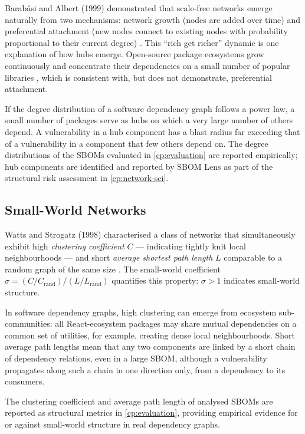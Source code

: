 Barabási and Albert (1999) demonstrated that scale-free networks emerge naturally from two mechanisms: network growth (nodes are added over time) and preferential attachment (new nodes connect to existing nodes with probability proportional to their current degree) \citep{Barabasi1999}. This ``rich get richer'' dynamic is one explanation of how hubs emerge. Open-source package ecosystems grow continuously and concentrate their dependencies on a small number of popular libraries \citep{Kikas2017,Decan2019}, which is consistent with, but does not demonstrate, preferential attachment.

If the degree distribution of a software dependency graph follows a power law, a small number of packages serve as hubs on which a very large number of others depend. A vulnerability in a hub component has a blast radius far exceeding that of a vulnerability in a component that few others depend on. The degree distributions of the SBOMs evaluated in \autoref{cp:evaluation} are reported empirically; hub components are identified and reported by SBOM Lens as part of the structural risk assessment in \autoref{cp:network-sci}.


\subsection{Small-World Networks}
\label{sec:small-world}

Watts and Strogatz (1998) characterised a class of networks that simultaneously exhibit high \textit{clustering coefficient} \(C\) --- indicating tightly knit local neighbourhoods --- and short \textit{average shortest path length} \(L\) comparable to a random graph of the same size \citep{WattsStrogatz1998}. The small-world coefficient \citep{HumphriesGurney2008} \(\sigma = (C / C_{\mathrm{rand}}) / (L / L_{\mathrm{rand}})\) quantifies this property: \(\sigma > 1\) indicates small-world structure.

In software dependency graphs, high clustering can emerge from ecosystem sub-communities: all React-ecosystem packages may share mutual dependencies on a common set of utilities, for example, creating dense local neighbourhoods. Short average path lengths mean that any two components are linked by a short chain of dependency relations, even in a large SBOM, although a vulnerability propagates along such a chain in one direction only, from a dependency to its consumers.

The clustering coefficient and average path length of analysed SBOMs are reported as structural metrics in \autoref{cp:evaluation}, providing empirical evidence for or against small-world structure in real dependency graphs.


